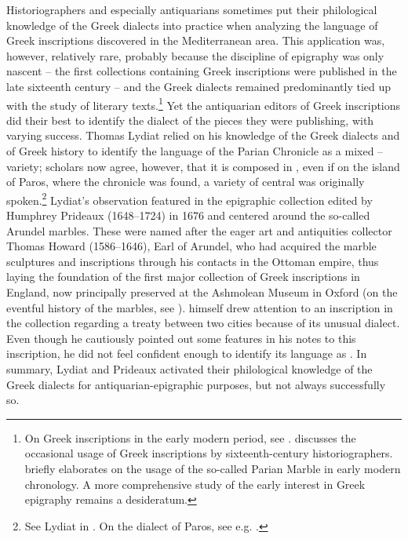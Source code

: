 Historiographers and especially antiquarians sometimes put their philological knowledge of the Greek dialects into practice when analyzing the language of Greek inscriptions discovered in the Mediterranean area. This application was, however, relatively rare, probably because the discipline of epigraphy was only nascent – the first collections containing Greek inscriptions were published in the late sixteenth century – and the Greek dialects remained predominantly tied up with the study of literary texts.\footnote{On Greek inscriptions in the early modern period, see \citet{Stenhouse_greekness_nodate}. \citet{Stenhouse2005} discusses the occasional usage of Greek inscriptions by sixteenth-century  historiographers. \citet{Liddel2014} briefly elaborates on the usage of the so-called Parian Marble in early modern chronology. A more comprehensive study of the early interest in Greek epigraphy remains a desideratum.} Yet the antiquarian editors of Greek inscriptions did their best to identify the dialect of the pieces they were publishing, with varying success. Thomas Lydiat relied on his knowledge of the Greek dialects and of Greek history to identify the language of the Parian Chronicle as a mixed – variety; scholars now agree, however, that it is composed in , even if on the island of Paros, where the chronicle was found, a variety of central  was originally spoken.\footnote{See Lydiat in \citet[\textsc{ii}.116–117]{Prideaux1676}. On the dialect of Paros, see e.g. \citet[531]{Alonso2018}.} Lydiat’s observation featured in the epigraphic collection edited by Humphrey Prideaux (1648–1724) in 1676 and centered around the so-called Arundel marbles. These were named after the eager art and antiquities collector Thomas Howard (1586–1646), Earl of Arundel, who had acquired the marble sculptures and inscriptions through his contacts in the Ottoman empire, thus laying the foundation of the first major collection of Greek inscriptions in England, now principally preserved at the Ashmolean Museum in Oxford (on the eventful history of the marbles, see \citealt{Vickers2006}). \citet[\textsc{i.}a.1\textsc{\textsuperscript{v}}, 123]{Prideaux1676} himself drew attention to an inscription in the collection regarding a treaty between two  cities because of its unusual dialect. Even though he cautiously pointed out some  features in his notes to this inscription, he did not feel confident enough to identify its language as . In summary, Lydiat and Prideaux activated their philological knowledge of the Greek dialects for antiquarian-epigraphic purposes, but not always successfully so.

